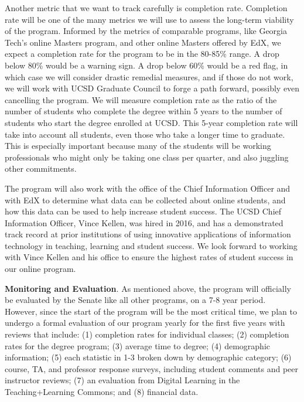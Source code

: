 \documentclass[11pt,letterpaper]{article}
\begin{document}
Another metric that we want to track carefully is completion rate.
Completion rate will be one of the many metrics we will use to assess
the long-term viability of the program. Informed by the metrics of
comparable programs, like Georgia Tech’s online Masters program, and
other online Masters offered by EdX, we expect a completion rate for
the program to be in the 80-85\% range. A drop below 80\% would be a
warning sign. A drop below 60\% would be a red flag, in which case we
will consider drastic remedial measures, and if those do not work, we
will work with UCSD Graduate Council to forge a path forward, possibly
even cancelling the program. We will measure completion rate as the
ratio of the number of students who complete the degree within 5 years
to the number of students who start the degree enrolled at UCSD. This
5-year completion rate will take into account all students, even those
who take a longer time to graduate. This is especially important
because many of the students will be working professionals who might
only be taking one class per quarter, and also juggling other
commitments.

The program will also work with the office of the Chief Information
Officer and with EdX to determine what data can be collected about
online students, and how this data can be used to help increase
student success. The UCSD Chief Information Officer, Vince Kellen, was
hired in 2016, and has a demonstrated track record at prior
institutions of using innovative applications of information
technology in teaching, learning and student success. We look forward
to working with Vince Kellen and his office to ensure the highest
rates of student success in our online program.

{\bf Monitoring and Evaluation}. As mentioned above, the program will
officially be evaluated by the Senate like all other programs, on a
7-8 year period. However, since the start of the program will be the
most critical time, we plan to undergo a formal evaluation of our
program yearly for the first five years with reviews that include: (1)
completion rates for individual classes; (2) completion rates for the
degree program; (3) average time to degree; (4) demographic
information; (5) each statistic in 1-3 broken down by demographic
category; (6) course, TA, and professor response surveys, including
student comments and peer instructor reviews; (7) an evaluation from
Digital Learning in the Teaching+Learning Commons; and (8) financial
data.
\end{document}
